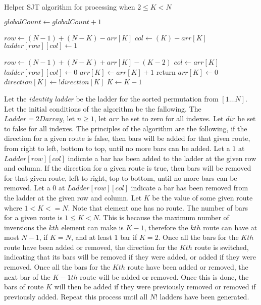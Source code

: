 \begin{algorithm}
  \caption{Helper SJT algorithm for processing when $2 \leq K < N$}
  \begin{algorithmic}[1]

        \State $globalCount \gets globalCount + 1$

            \State $row \gets (N-1) + (N-K) - arr[K]$
            \State $col \gets (K) - arr[K]$
            \State $ladder[row][col] \gets 1$

          \Else
            \State $row \gets  (N-1) + (N-K) + arr[K] - (K-2)$
            \State $col \gets arr[K]$
            \State $ladder[row][col] \gets 0$
          \EndIf
          \State $arr[K]\gets arr[K]+1$
          \State return
        \Else 
          \State $arr[K] \gets 0$
          \State $direction[K] \gets !direction[K]$
        \EndIf
        $K \gets K-1$
      \EndFor
      \EndFunction
  \end{algorithmic}
\end{algorithm}
\pagebreak

Let the \emph{identity ladder} be the ladder for the sorted permutation from $[1 \dots N]$.
Let the initial conditions of the algorithm be the fallowing. The $Ladder= 2D array$,  
let $n \geq 1$, let $arr$ be set to zero for all indexes. Let $dir$ be set to false 
for all indexes. The principles of the algorithm are the following, if the direction for a 
given route is false, then bars will be added for that given route, from right to left, bottom to top, until no more bars can be added. Let a 
$1$ at $Ladder[row][col]$ indicate a bar has been added to the ladder at the given row and column.
If the direction for a given route is true, then bars will be removed for that given route, left to right, top to bottom, until 
no more bars can be removed. Let a $0$ at $Ladder[row][col]$ indicate a bar has been removed from the ladder 
at the given row and column. Let $K$ be the value of some given route where $1 < K <= N$. Note that element one has no route.
The number of bars for a given route is $1 \leq K < N$. This is because the maximum number of inversions 
the $kth$ element can make is $K-1$, therefore the $kth$ route can have at most $N-1$, if $K=N$, and 
at least $1$ bar if $K=2$. Once all the bars for the $Kth$ route have been added 
or removed, the direction for the $Kth$ route is switched, indicating that its bars will be removed if they 
were added, or added if they were removed. Once all the bars for the $Kth$ route have been added or removed, 
the next bar of the $K-1th$ route will be added or removed. Once this is done, the bars of route $K$ will 
then be added if they were previously removed or removed if previously added. Repeat this process until all
$N!$ ladders have been generated.


